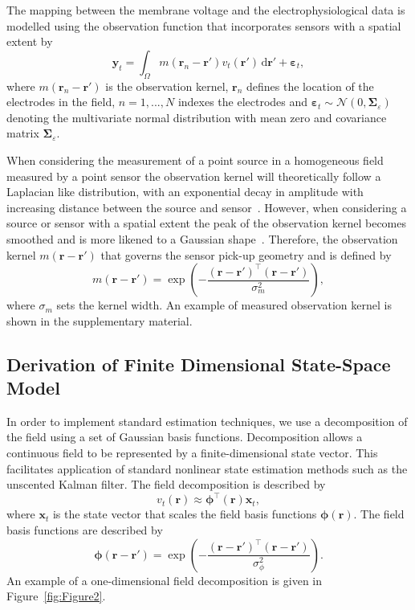 \documentclass[12pt]{iopart}
\begin{document}
The mapping between the membrane voltage and the electrophysiological data is modelled using the observation function that incorporates sensors with a spatial extent by
\begin{equation}
    \label{eq:ObservationEquation}
	\mathbf{y}_t =
	\int_{\Omega}{
	    m\left(\mathbf{r}_n-\mathbf{r}'\right)v_t\left(\mathbf{r}'\right)
	\, \mathrm{d}\mathbf{r}'} + 
	\boldsymbol{\varepsilon}_t, 
\end{equation}
where $m\left(\mathbf{r}_n-\mathbf{r}'\right)$ is the observation kernel, $\mathbf{r}_n$ defines the location of the electrodes in the field, $n=1,...,N$ indexes the electrodes and $\boldsymbol{\varepsilon}_t \sim \mathcal{N}\left(0,\boldsymbol{\Sigma}_{\varepsilon}\right)$ denoting the multivariate normal distribution with mean zero and covariance matrix $\boldsymbol{\Sigma}_{\varepsilon}$. 

When considering the measurement of a point source in a homogeneous field measured by a point sensor the observation kernel will theoretically follow a Laplacian like distribution, with an exponential decay in amplitude with increasing distance between the source and sensor~\cite{Jackson1999}. However, when considering a source or sensor with a spatial extent the peak of the observation kernel becomes smoothed and is more likened to a Gaussian shape~\cite{Jackson1999}. Therefore, the observation kernel $m(\mathbf{r}-\mathbf{r}')$ that governs the sensor pick-up geometry and is defined by 
\begin{equation}
	m\left(\mathbf{r}-\mathbf{r}'\right) = \exp{\left(-\frac{(\mathbf{r}-\mathbf{r}')^\top(\mathbf{r}-\mathbf{r}')}{\sigma_m^2}\right)},
\end{equation}
where $\sigma_m$ sets the kernel width. An example of measured observation kernel is shown in the supplementary material.

\subsection{Derivation of Finite Dimensional State-Space Model}\label{Sect:ReducedModelDerivation}
In order to implement standard estimation techniques, we use a decomposition of the field using a set of Gaussian basis functions. Decomposition allows a continuous field to be represented by a finite-dimensional state vector. This facilitates application of standard nonlinear state estimation methods such as the unscented Kalman filter. The field decomposition is described by 
\begin{equation}
	\label{DefFieldDecomp} v_t\left(\mathbf{r}\right) \approx \boldsymbol{\phi}^{\top}\left(\mathbf{r}\right) \mathbf{x}_t, 
\end{equation}
where $\mathbf{x}_t$ is the state vector that scales the field basis functions $\mathbf{\boldsymbol{\phi}}(\mathbf{r})$. The field basis functions are described by
\begin{equation}\label{eq:FieldBasisFunction}
	\boldsymbol\phi\left(\mathbf{r}-\mathbf{r}'\right) =
\exp{\left(-\frac{(\mathbf{r}-\mathbf{r}')^\top(\mathbf{r}-\mathbf{r}')}{\sigma_{\phi}^2}\right)}. 
\end{equation}
An example of a one-dimensional field decomposition is given in Figure~\ref{fig:Figure2}.
\end{document}
